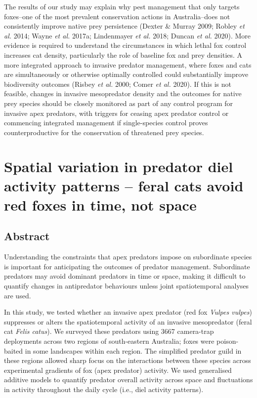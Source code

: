 \documentclass[11pt,a4paper,titlepage,twoside,openright]{style/unimelbthesis}
\begin{document}
\begin{mainmatter}
The results of our study may explain why pest management that only targets foxes--one of the most prevalent conservation actions in Australia--does not consistently improve native prey persistence (Dexter \& Murray 2009; Robley \emph{et al.} 2014; Wayne \emph{et al.} 2017a; Lindenmayer \emph{et al.} 2018; Duncan \emph{et al.} 2020). More evidence is required to understand the circumstances in which lethal fox control increases cat density, particularly the role of baseline fox and prey densities. A more integrated approach to invasive predator management, where foxes and cats are simultaneously or otherwise optimally controlled could substantially improve biodiversity outcomes (Risbey \emph{et al.} 2000; Comer \emph{et al.} 2020). If this is not feasible, changes in invasive mesopredator density and the outcomes for native prey species should be closely monitored as part of any control program for invasive apex predators, with triggers for ceasing apex predator control or commencing integrated management if single-species control proves counterproductive for the conservation of threatened prey species.

\hypertarget{diel}{%
\chapter{Spatial variation in predator diel activity patterns -- feral cats avoid red foxes in time, not space}\label{diel}}

\hypertarget{abstract-3}{%
\section*{Abstract}\label{abstract-3}}

Understanding the constraints that apex predators impose on subordinate species is important for anticipating the outcomes of predator management. Subordinate predators may avoid dominant predators in time or space, making it difficult to quantify changes in antipredator behaviours unless joint spatiotemporal analyses are used.

In this study, we tested whether an invasive apex predator (red fox \emph{Vulpes vulpes}) suppresses or alters the spatiotemporal activity of an invasive mesopredator (feral cat \emph{Felis catus}). We surveyed these predators using 3667 camera-trap deployments across two regions of south-eastern Australia; foxes were poison-baited in some landscapes within each region. The simplified predator guild in these regions allowed sharp focus on the interactions between these species across experimental gradients of fox (apex predator) activity. We used generalised additive models to quantify predator overall activity across space and fluctuations in activity throughout the daily cycle (i.e., diel activity patterns).


\end{mainmatter}
\end{document}
